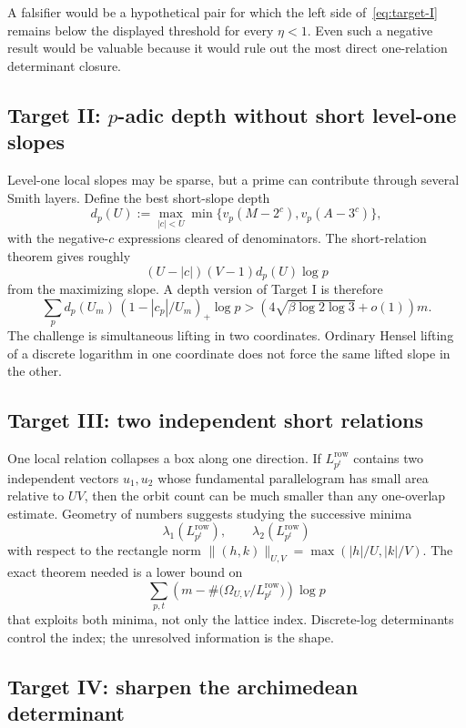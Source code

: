\documentclass[11pt]{article}
\theoremstyle{definition}
\theoremstyle{remark}
\begin{document}
A falsifier would be a hypothetical pair for which the left side of~\eqref{eq:target-I} remains below the displayed threshold for every $\eta<1$.  Even such a negative result would be valuable because it would rule out the most direct one-relation determinant closure.

\subsection{Target II: $p$-adic depth without short level-one slopes}

Level-one local slopes may be sparse, but a prime can contribute through several Smith layers.  Define the best short-slope depth
\[
 d_p(U):=
 \max_{|c|<U}\min\{v_p(M-2^c),v_p(A-3^c)\},
\]
with the negative-$c$ expressions cleared of denominators.  The short-relation theorem gives roughly
\[
 (U-|c|)(V-1)d_p(U)\log p
\]
from the maximizing slope.  A depth version of Target I is therefore
\begin{equation}
 \sum_p d_p(U_m)\,(1-|c_p|/U_m)_+\log p
 >\left(4\sqrt{\beta\log2\log3}+o(1)\right)m.
 \label{eq:target-II}
\end{equation}
The challenge is simultaneous lifting in two coordinates.  Ordinary Hensel lifting of a discrete logarithm in one coordinate does not force the same lifted slope in the other.

\subsection{Target III: two independent short relations}

One local relation collapses a box along one direction.  If $L^{\mathrm{row}}_{p^t}$ contains two independent vectors $u_1,u_2$ whose fundamental parallelogram has small area relative to $UV$, then the orbit count can be much smaller than any one-overlap estimate.  Geometry of numbers suggests studying the successive minima
\[
 \lambda_1(L^{\mathrm{row}}_{p^t}),
 \qquad
 \lambda_2(L^{\mathrm{row}}_{p^t})
\]
with respect to the rectangle norm
$\|(h,k)\|_{U,V}=\max(|h|/U,|k|/V)$.  The exact theorem needed is a lower bound on
\[
 \sum_{p,t}
 \left(m-\#\bigl(\Omega_{U,V}/L^{\mathrm{row}}_{p^t}\bigr)\right)\log p
\]
that exploits both minima, not only the lattice index.  Discrete-log determinants control the index; the unresolved information is the shape.

\subsection{Target IV: sharpen the archimedean determinant}
\end{document}
